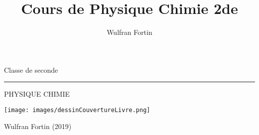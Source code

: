 \documentclass[10pt,a4paper,twoside,twocolumn]{book}
\author{Wulfran Fortin}
\title{Cours de Physique Chimie  2de}
\begin{document}

\begin{titlepage}
		\selectfont \color{couleurtitres}
		\begin{flushright} \LARGE
			Classe de seconde
		\end{flushright}
		\hrule
		\begin{flushleft}
			\Huge\mdseries
			\MakeUppercase{Physique chimie}
		\end{flushleft}
		\begin{center}
			\texttt{[image: images/dessinCouvertureLivre.png]}
		\end{center}
		\begin{center}
			Wulfran Fortin (2019)
		\end{center}
\end{titlepage}


\end{document}
